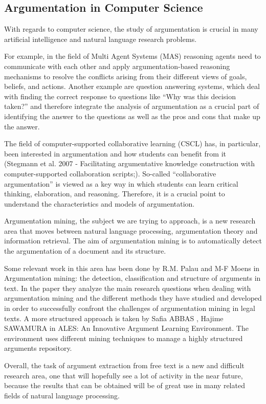 \documentclass[lnbip]{svmultln}
\begin{document}
\subsection{Argumentation in Computer Science}
\par
With regards to computer science, the study of argumentation is crucial in many artificial intelligence and natural language research problems.
\par
For example, in the field of Multi Agent Systems (MAS) reasoning agents need to communicate with each other and apply argumentation-based reasoning mechanisms to resolve the conflicts arising from their different views of goals, beliefs, and actions.
Another example are question answering systems, which deal with finding the correct response to questions like ``Why was this decision taken?'' and therefore integrate the analysis of argumentation as a crucial part of identifying the answer to the questions as well as the pros and cons that make up the answer.
\par
The field of computer-supported collaborative learning (CSCL) has, in particular, been interested in argumentation and how students can benefit from it (Stegmann et al. 2007 - Facilitating argumentative knowledge construction with computer-supported collaboration scripts;). So-called ``collaborative argumentation'' is viewed as a key way in which students can learn critical thinking, elaboration, and reasoning.
Therefore, it is a crucial point to understand the characteristics and models of argumentation.
\par
Argumentation mining, the subject we are trying to approach, is a new research area that moves between natural language processing, argumentation theory and information retrieval. The aim of argumentation mining is to automatically detect the argumentation of a document and its structure.
\par
Some relevant work in this area has been done by R.M. Palau and M-F Moens in Argumentation mining: the detection, classification and structure of arguments in text. In the paper they analyze the main research questions when dealing with argumentation mining and the different methods they have studied and developed in order to successfully confront the challenges of argumentation mining in legal texts.
A more structured approach is taken by Safia ABBAS , Hajime SAWAMURA in ALES: An Innovative Argument Learning Environment. The environment uses different mining techniques to manage a highly structured arguments repository.
 \par
Overall, the task of argument extraction from free text is a new and difficult research area, one that will hopefully see a lot of activity in the near future, because the results that can be obtained will be of great use in many related fields of natural language processing.
\end{document}
